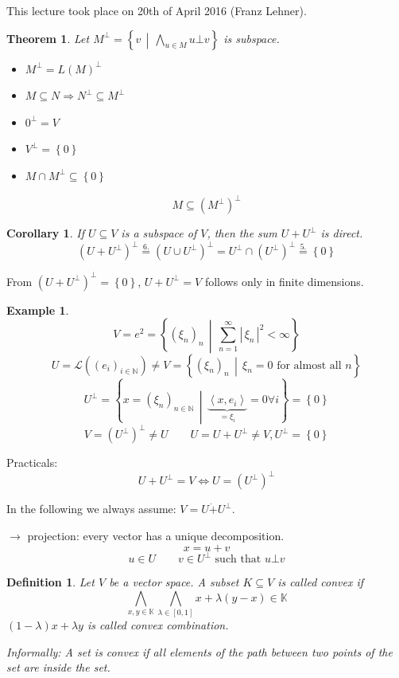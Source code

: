 \documentclass[a4paper,landscape,twocolumn]{article}
\newcommand\meta[3]{This #1 took place on #2 (#3).\par}
\newcommand\abs[1]{|\,#1\,|}
\newcommand\set[1]{\left\{#1\right\}}
\newcommand\setdef[2]{\left\{#1\,\middle|\,#2\right\}}
\newcommand\functional[1]{\left\langle{#1}\right\rangle}
\newtheorem{theorem}{Theorem}
\newtheorem{defi}{Definition}
\newtheorem{ex}{Example}
\newtheorem{cor}{Corollary}
\begin{document}
\meta{lecture}{20th of April 2016}{Franz Lehner}

\begin{theorem}
  Let $M^\bot = \setdef{v}{\bigwedge_{u \in M} u \bot v}$ is subspace.

  \begin{itemize}
    \item[6.] $M^\bot = L(M)^\bot$
    \item[2.] $M \subseteq N \Rightarrow N^\bot \subseteq M^\bot$
    \item[3.] $0^\bot = V$
    \item[4.] $V^\bot = \set{0}$
    \item[5.] $M \cap M^\bot \subseteq \set{0}$
  \end{itemize}
  \[ M \subseteq (M^\bot)^\bot \]
\end{theorem}

\begin{cor}
  \label{folderung-8.42}
  If $U \subseteq V$ is a subspace of $V$, then the sum $U + U^\bot$ is direct.
  \[ (U + U^\bot)^\bot \overset{\text{6.}}{=} (U \cup U^\bot)^\bot = U^\bot \cap (U^\bot)^\bot \overset{5.}{=} \set{0} \]
\end{cor}

From $(U + U^\bot)^\bot = \set{0}$, $U + U^\bot = V$ follows only in finite dimensions.

\begin{ex}
  \[ V = e^2 = \setdef{(\xi_n)_n}{\sum_{n=1}^\infty \abs{\xi_n}^2 < \infty} \]
  \[ U = \mathcal L((e_i)_{i \in \mathbb N}) \neq V = \setdef{(\xi_n)_n}{\xi_n = 0 \text{ for almost all } n} \]
  \[ U^\bot = \setdef{x = (\xi_n)_{n \in \mathbb N}}{\underbrace{\functional{x, e_i}}_{=\xi_i} = 0 \forall i} = \set{0} \]
  \[ V = (U^\bot)^\bot \neq U \qquad U = U + U^\bot \neq V, U^\bot = \set{0} \]
\end{ex}

Practicals:
\[ U + U^\bot = V \Leftrightarrow U = (U^\bot)^\bot \]

In the following we always assume: $V = U \dot{+} U^\bot$.

$\rightarrow$ projection: every vector has a unique decomposition.
\[ x = u + v \]
\[ u \in U \qquad v \in U^\bot \text{ such that } u \bot v \]

\begin{defi}
  \label{defi-8.44}
  Let $V$ be a vector space.
  A subset $K \subseteq V$ is called convex if
  \[ \bigwedge_{x,y \in \mathbb K} \bigwedge_{\lambda \in [0,1]} x + \lambda (y - x) \in \mathbb K \]
  $(1 - \lambda) x + \lambda y$ is called \emph{convex combination}.

  Informally: A set is convex if all elements of the path between two points of the set
  are inside the set.
\end{defi}
\end{document}
